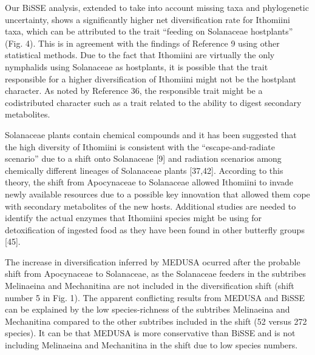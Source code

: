 \documentclass[]{article}
\begin{document}
Our BiSSE analysis, extended to take into account missing taxa and
phylogenetic uncertainty, shows a significantly higher net
diversification rate for Ithomiini taxa, which can be attributed to the
trait ``feeding on Solanaceae hostplants'' (Fig. 4). This is in
agreement with the findings of Reference 9 using other statistical
methods. Due to the fact that Ithomiini are virtually the only
nymphalids using Solanaceae as hostplants, it is possible that the trait
responsible for a higher diversification of Ithomiini might not be the
hostplant character. As noted by Reference 36, the responsible trait
might be a codistributed character such as a trait related to the
ability to digest secondary metabolites.

Solanaceae plants contain chemical compounds and it has been suggested
that the high diversity of Ithomiini is consistent with the
``escape-and-radiate scenario'' due to a shift onto Solanaceae {[}9{]}
and radiation scenarios among chemically different lineages of
Solanaceae plants {[}37,42{]}. According to this theory, the shift from
Apocynaceae to Solanaceae allowed Ithomiini to invade newly available
resources due to a possible key innovation that allowed them cope with
secondary metabolites of the new hosts. Additional studies are needed to
identify the actual enzymes that Ithomiini species might be using for
detoxification of ingested food as they have been found in other
butterfly groups {[}45{]}.

The increase in diversification inferred by MEDUSA ocurred after the
probable shift from Apocynaceae to Solanaceae, as the Solanaceae feeders
in the subtribes Melinaeina and Mechanitina are not included in the
diversification shift (shift number 5 in Fig. 1). The apparent
conflicting results from MEDUSA and BiSSE can be explained by the low
species-richness of the subtribes Melinaeina and Mechanitina compared to
the other subtribes included in the shift (52 versus 272 species). It
can be that MEDUSA is more conservative than BiSSE and is not including
Melinaeina and Mechanitina in the shift due to low species numbers.
\end{document}
